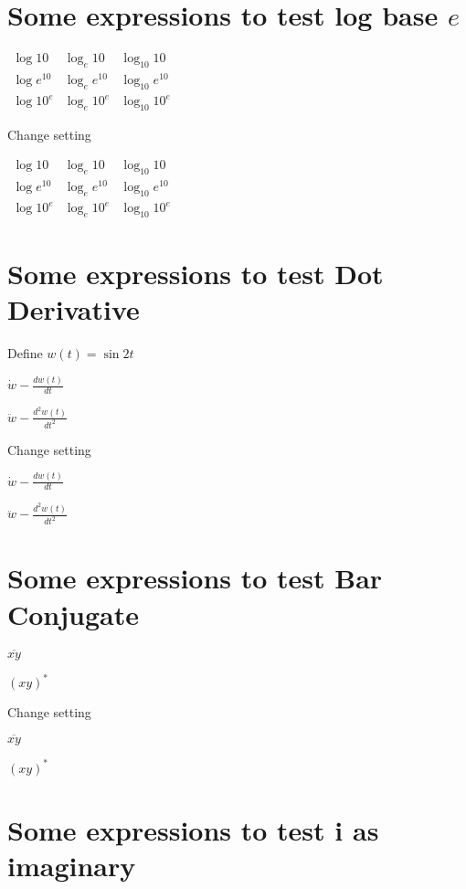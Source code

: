 \documentclass{article}
\begin{document}
\section{Some expressions to test log base $e$}

$%
\begin{array}{ccc}
\log 10 & \log _{e}10 & \log _{10}10 \\ 
\log e^{10} & \log _{e}e^{10} & \log _{10}e^{10} \\ 
\log 10^{e} & \log _{e}10^{e} & \log _{10}10^{e}%
\end{array}%
$

Change setting

$%
\begin{array}{ccc}
\log 10 & \log _{e}10 & \log _{10}10 \\ 
\log e^{10} & \log _{e}e^{10} & \log _{10}e^{10} \\ 
\log 10^{e} & \log _{e}10^{e} & \log _{10}10^{e}%
\end{array}%
$

\section{Some expressions to test Dot Derivative}

Define $w\left( t\right) =\sin 2t$

$\dot{w}-\frac{dw\left( t\right) }{dt}$

$\ddot{w}-\frac{d^{2}w\left( t\right) }{dt^{2}}$

Change setting

$\dot{w}-\frac{dw\left( t\right) }{dt}$

$\ddot{w}-\frac{d^{2}w\left( t\right) }{dt^{2}}$

\section{Some expressions to test Bar Conjugate}

$\overline{xy}$

$\left( xy\right) ^{\ast }$

Change setting

$\overline{xy}$

$\left( xy\right) ^{\ast }$

\section{Some expressions to test i as imaginary}
\end{document}
